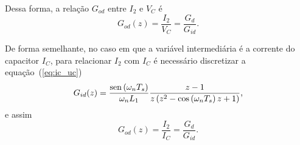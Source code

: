     Dessa forma, a relação $G_{od}$ entre $I_2$ e $V_C$ é
    \begin{equation}
        G_{od}(z) = \frac{I_2}{V_C} = \frac{G_d}{G_{id}} \text{.}
    \end{equation}

    De forma semelhante, no caso em que a variável intermediária é a corrente do
    capacitor $I_C$, para relacionar $I_2$ com $I_C$ é necessário discretizar a
    equação~(\ref{eq:ic_uc})
    \begin{equation}
        G_{id}(z) = \frac{\operatorname{sen} \left( \omega_n T_s \right)}{\omega_n L_1}
            \frac{z-1}{z \left( z^2 - \cos \left( \omega_n T_s \right) z + 1 \right)}
            \text{,}
    \end{equation}
    e assim
    \begin{equation}
        G_{od}(z) = \frac{I_2}{I_C} = \frac{G_d}{G_{id}} \text{.}
    \end{equation}


